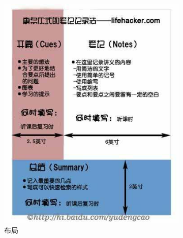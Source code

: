 \begin{figure}[h]
	\centering
	\begin{subfigure}[t]{0.45\textwidth}
		\centering
		\includegraphics[width=\textwidth]{./images/Ch00/Cornell-NTS/NTS-CH.jpg}
		\caption{布局}\label{fig:5R-1}
	\end{subfigure}
	\begin{subfigure}[t]{0.45\textwidth}
		\centering

\end{subfigure}
\end{figure}
